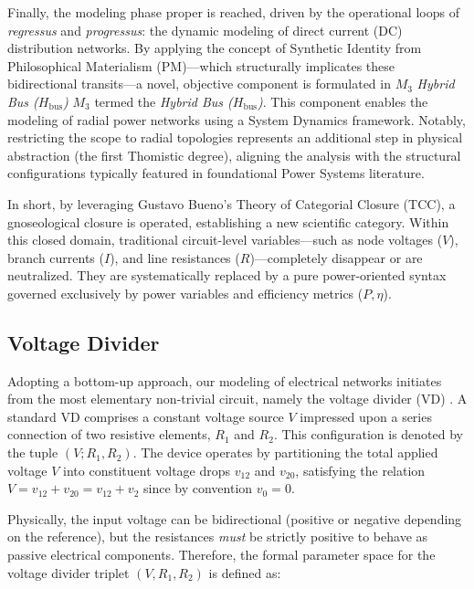 \documentclass[energies,accept,oneauthor,pdftex]{Definitions/mdpi}
\begin{document}
Finally, the modeling phase proper is reached, driven by the operational loops of \textit{regressus} and \textit{progressus}:
the dynamic modeling of direct current (DC) distribution networks. By applying the concept of Synthetic Identity from Philosophical Materialism (PM)—which structurally implicates these bidirectional transits—a novel, objective component is formulated in $M_3$
\textit{Hybrid Bus ($H_{\text{bus}}$)}  $M_3$ termed the \textit{Hybrid Bus ($H_{\text{bus}}$)}. This component enables the modeling of radial power networks using a System Dynamics framework. Notably, restricting the scope to radial topologies represents an additional step in physical abstraction (the first Thomistic degree), aligning the analysis with the structural configurations typically featured in foundational Power Systems literature.


In short, by leveraging Gustavo Bueno’s Theory of Categorial Closure (TCC), a gnoseological closure is operated, establishing a new scientific category. Within this closed domain, traditional circuit-level variables—such as node voltages ($V$), branch currents ($I$), and line resistances ($R$)—completely disappear or are neutralized. They are systematically replaced by a pure power-oriented syntax governed exclusively by power variables and efficiency metrics ($P, \eta$).


\subsection{Voltage Divider}


Adopting a bottom-up approach, our modeling of electrical networks initiates from the most elementary non-trivial circuit, namely the voltage divider (VD) \cite{alexander2021fundamentals}. A standard VD comprises a constant voltage source $V$ impressed upon a series connection of two resistive elements, $R_1$ and $R_2$. This configuration is denoted by the tuple $(V; R_1, R_2)$. The device operates by partitioning the total applied voltage $V$ into constituent voltage drops $v_{12}$ and $v_{20}$,
satisfying the relation $V = v_{12} + v_{20} = v_{12} + v_{2}$ since by convention $v_0=0$.

Physically, the input voltage can be bidirectional (positive or negative depending on the reference), but the resistances \textit{must} be strictly positive to behave as passive electrical components. Therefore, the formal parameter space for the voltage divider triplet $(V, R_1, R_2)$ is defined as:
\end{document}
